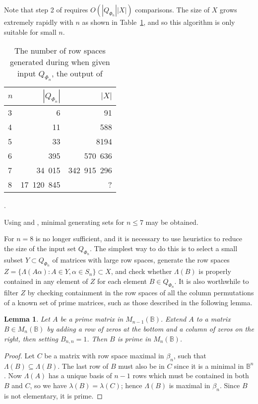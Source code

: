 \documentclass[11pt]{article}
\newtheorem{lemma}[thm]{Lemma}
\numberwithin{equation}{section}
\newcommand{\set}[2]{\ensuremath{\{#1 : #2 \}}}
\newcommand{\B}{\mathbb{B}}
\newcommand{\Bn}{M_n(\B)}
\newcommand{\RowS}{\Lambda}
\newcommand{\RowB}{\lambda}
\begin{document}
Note that step 2 of  requires $O(|Q_{\Phi_n}||X|)$ comparisons.  The
size of $X$ grows extremely rapidly with $n$ as shown in
Table~\ref{tab:filter1numbers}, and so this algorithm is only suitable for small $n$.
\begin{table}
  \centering
  \begin{tabular}{l|r|r}
    $n$ & $|Q_{\Phi_n}|$ & $|X|$ \\
    \hline
    3 & 6 & 91 \\ 
    4 & 11 & 588 \\
    5 & 33 & 8194 \\
    6 & 395 & 570\ 636 \\ 
    7 & 34\ 015 & 342\ 915\ 296 \\
    8 & 17\ 120\ 845 & ? 
  \end{tabular}
\vspace{1cm}

\caption{The number of row spaces generated during  when
  given input $Q_{\Phi_n}$, the output of }. 
  \label{tab:filter1numbers}
\end{table}

Using  and , minimal
generating sets for $n \leq 7$ may be obtained.

For $n=8$  is no longer sufficient, and it is necessary to use
heuristics to reduce the size of the input set $Q_{\Phi_n}$. The simplest way to
do this is to select a small subset $Y \subset Q_{\Phi_n}$ of matrices with
large row spaces, generate the row spaces $Z = \set{\RowS(A\alpha)}{A \in Y,
  \alpha \in S_n} \subset X$, and check whether $\RowS(B)$ is properly contained
in any element of $Z$ for each element $B \in Q_{\Phi_n}$.  It is also
worthwhile to filter $Z$ by checking containment in the row spaces of all the
column permutations of a known set of prime matrices, such as those described in
the following lemma.

\begin{lemma}
  Let $A$ be a prime matrix in $M_{n-1}(\B)$. Extend $A$ to a matrix $B \in \Bn$
  by adding a row of zeros at the bottom and a column of zeros on the right,
  then setting $B_{n,n} = 1$. Then $B$ is prime in $\Bn$.
\end{lemma}
\begin{proof}
  Let $C$ be a matrix with row space maximal in $\beta_n$, such that $\RowS(B)
  \subseteq \RowS(B)$.  The last row of $B$ must also be in $C$ since it is a
  minimal in $\B^{n}$. Now $\RowS(A)$ has a unique basis of $n-1$ rows which
  must be contained in both $B$ and $C$, so we have $\RowB(B) = \RowB(C)$; hence
  $\RowS(B)$ is maximal in $\beta_n$. Since $B$ is not elementary, it is prime.
\end{proof}
\end{document}
